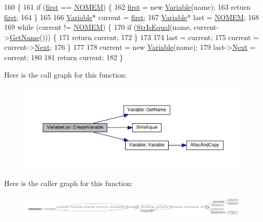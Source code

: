 \begin{DoxyCode}
160 \{
161     \textcolor{keywordflow}{if} (\hyperlink{classVariableList_a353a26f311a6d98716485f50c6907f7e}{first} == \hyperlink{platform_8h_a46ff2bfbf0d44b8466a2251d5bd5e6f8}{NOMEM}) \{
162         \hyperlink{classVariableList_a353a26f311a6d98716485f50c6907f7e}{first} = \textcolor{keyword}{new} \hyperlink{classVariable}{Variable}(name);
163         \textcolor{keywordflow}{return} \hyperlink{classVariableList_a353a26f311a6d98716485f50c6907f7e}{first};
164     \}
165 
166     \hyperlink{classVariable}{Variable}* current = \hyperlink{classVariableList_a353a26f311a6d98716485f50c6907f7e}{first};
167     \hyperlink{classVariable}{Variable}* last = \hyperlink{platform_8h_a46ff2bfbf0d44b8466a2251d5bd5e6f8}{NOMEM};
168 
169     \textcolor{keywordflow}{while} (current != \hyperlink{platform_8h_a46ff2bfbf0d44b8466a2251d5bd5e6f8}{NOMEM}) \{
170         \textcolor{keywordflow}{if} (\hyperlink{clib_8h_a2a1f39d11cbbaac992d42e67557dac4b}{StrIsEqual}(name, current->\hyperlink{classVariable_accf221d35cec8a9707e84891b715fb6c}{GetName}())) \{
171             \textcolor{keywordflow}{return} current;
172         \}
173 
174         last = current;
175         current = current->\hyperlink{classVariable_ac5662d23fccccf25e3565793841ce580}{Next};
176     \}
177 
178     current = \textcolor{keyword}{new} \hyperlink{classVariable}{Variable}(name);
179     last->\hyperlink{classVariable_ac5662d23fccccf25e3565793841ce580}{Next} = current;
180 
181     \textcolor{keywordflow}{return} current;
182 \}
\end{DoxyCode}


Here is the call graph for this function\+:
\nopagebreak
\begin{figure}[H]
\begin{center}
\leavevmode
\includegraphics[width=350pt]{d3/d0e/classVariableList_ac78b3d52283bec7cbd8e7e2d217e1608_cgraph}
\end{center}
\end{figure}




Here is the caller graph for this function\+:
\nopagebreak
\begin{figure}[H]
\begin{center}
\leavevmode
\includegraphics[width=350pt]{d3/d0e/classVariableList_ac78b3d52283bec7cbd8e7e2d217e1608_icgraph}
\end{center}
\end{figure}


